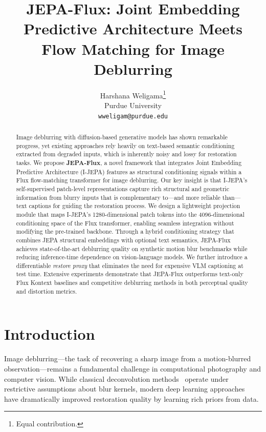 \documentclass{article}
\title{JEPA-Flux: Joint Embedding Predictive Architecture Meets Flow Matching for Image Deblurring}
\author{%
  Harshana Weligama\thanks{Equal contribution.} \\
  Purdue University\\
  \texttt{wweligam@purdue.edu} \\
}
\begin{document}
\maketitle

\begin{abstract}
Image deblurring with diffusion-based generative models has shown remarkable progress, yet existing approaches rely heavily on text-based semantic conditioning extracted from degraded inputs, which is inherently noisy and lossy for restoration tasks. We propose \textbf{JEPA-Flux}, a novel framework that integrates Joint Embedding Predictive Architecture (I-JEPA) features as structural conditioning signals within a Flux flow-matching transformer for image deblurring. Our key insight is that I-JEPA's self-supervised patch-level representations capture rich structural and geometric information from blurry inputs that is complementary to---and more reliable than---text captions for guiding the restoration process. We design a lightweight projection module that maps I-JEPA's 1280-dimensional patch tokens into the 4096-dimensional conditioning space of the Flux transformer, enabling seamless integration without modifying the pre-trained backbone. Through a hybrid conditioning strategy that combines JEPA structural embeddings with optional text semantics, JEPA-Flux achieves state-of-the-art deblurring quality on synthetic motion blur benchmarks while reducing inference-time dependence on vision-language models. We further introduce a differentiable \emph{restore proxy} that eliminates the need for expensive VLM captioning at test time. Extensive experiments demonstrate that JEPA-Flux outperforms text-only Flux Kontext baselines and competitive deblurring methods in both perceptual quality and distortion metrics.
\end{abstract}

\section{Introduction}
\label{sec:intro}

Image deblurring---the task of recovering a sharp image from a motion-blurred observation---remains a fundamental challenge in computational photography and computer vision. While classical deconvolution methods~\cite{wiener1949extrapolation, richardson1972bayesian, lucy1974iterative} operate under restrictive assumptions about blur kernels, modern deep learning approaches~\cite{zamir2022restormer, chen2022nafnet, kong2023efficient} have dramatically improved restoration quality by learning rich priors from data.
\end{document}
